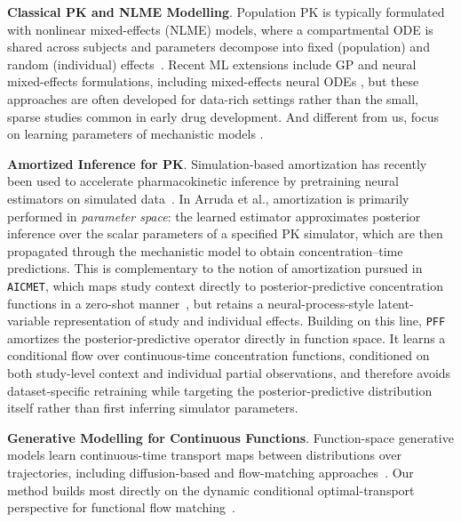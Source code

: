 
\textbf{Classical PK and NLME Modelling}. Population PK is typically formulated with nonlinear mixed-effects (NLME) models, where a compartmental ODE is shared across subjects and parameters decompose into fixed (population) and random (individual) effects~\citep{lavielle2014}. Recent ML extensions include GP and neural mixed-effects formulations, including mixed-effects neural ODEs \cite{kipnis2025metabeta}, but these approaches are often developed for data-rich settings rather than the small, sparse studies common in early drug development. And different from us, focus on learning parameters of mechanistic models \cite{haggstrom2025simulation}.

\textbf{Amortized Inference for PK}. Simulation-based amortization has recently been used to accelerate pharmacokinetic inference by pretraining neural estimators on simulated data~\citep{pmlr-v235-arruda24a}. In Arruda et al., amortization is primarily performed in \emph{parameter space}: the learned estimator approximates posterior inference over the scalar parameters of a specified PK simulator, which are then propagated through the mechanistic model to obtain concentration--time predictions. This is complementary to the notion of amortization pursued in \texttt{AICMET}, which maps study context directly to posterior-predictive concentration functions in a zero-shot manner~\citep{marin2025amortized}, but retains a neural-process-style latent-variable representation of study and individual effects. Building on this line, \texttt{PFF} amortizes the posterior-predictive operator directly in function space. It learns a conditional flow over continuous-time concentration functions, conditioned on both study-level context and individual partial observations, and therefore avoids dataset-specific retraining while targeting the posterior-predictive distribution itself rather than first inferring simulator parameters.


\textbf{Generative Modelling for Continuous Functions}. Function-space generative models learn continuous-time transport maps between distributions over trajectories, including diffusion-based and flow-matching approaches~\citep{bilovs2023modeling,kerrigan2023functional,kollovieh2024flow,jahn2025trajectory}. Our method builds most directly on the dynamic conditional optimal-transport perspective for functional flow matching~\citep{kerrigan2024dynamic}.

